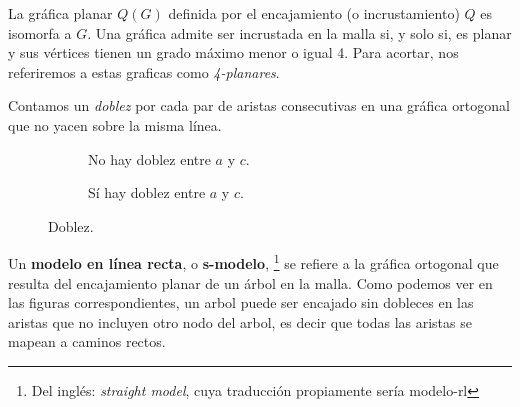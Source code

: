La gr\'afica planar $Q(G)$ definida por el encajamiento (o incrustamiento) $Q$ es isomorfa a $G$. Una gr\'afica admite ser incrustada en la malla si, y solo si, es planar y sus v\'ertices tienen un grado m\'aximo menor o igual 4. Para acortar, nos referiremos a estas graficas como \emph{4-planares}.

\begin{definition}[Doblez]
Contamos un \emph{doblez}\cite{minbends} por cada par de aristas consecutivas en una gr\'afica ortogonal que no yacen sobre la misma l\'inea.
\end{definition}

\begin{figure}
  \begin{subfigure}{0.4\textwidth}
    \caption{No hay doblez entre $a$ y $c$.}
  \end{subfigure}
  \begin{subfigure}{0.4\textwidth}
    \caption{S\'i hay doblez entre $a$ y $c$.}
  \end{subfigure}
  \caption{Doblez.}
\end{figure}

\begin{definition}
Un \textbf{modelo en l\'inea recta}\cite{minbends}, o \textbf{s-modelo}, \footnote{Del ingl\'es: \textit{straight model}, cuya traducci\'on propiamente ser\'ia modelo-rl} se refiere a la gr\'afica ortogonal que resulta del encajamiento planar de un \'arbol en la malla. Como podemos ver en las figuras correspondientes, un arbol puede ser encajado sin dobleces en las aristas que no incluyen otro nodo del arbol, es decir que todas las aristas se mapean a caminos rectos.
\end{definition}

